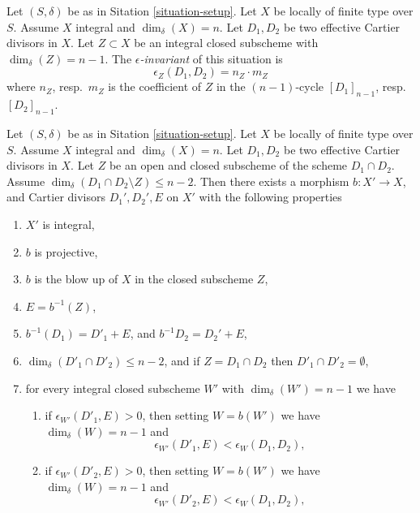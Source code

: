 \begin{definition}
\label{definition-epsilon}
Let $(S, \delta)$ be as in Sitation \ref{situation-setup}.
Let $X$ be locally of finite type over $S$.
Assume $X$ integral and $\dim_\delta(X) = n$.
Let $D_1, D_2$ be two effective Cartier divisors in $X$.
Let $Z \subset X$ be an integral closed subscheme
with $\dim_\delta(Z) = n - 1$. The {\it $\epsilon$-invariant}
of this situation is
$$
\epsilon_Z(D_1, D_2) = n_Z \cdot m_Z
$$
where $n_Z$, resp.\ $m_Z$ is the coefficient of
$Z$ in the $(n - 1)$-cycle $[D_1]_{n - 1}$, resp.\ $[D_2]_{n - 1}$.
\end{definition}

\begin{lemma}
\label{lemma-two-divisors}
Let $(S, \delta)$ be as in Sitation \ref{situation-setup}.
Let $X$ be locally of finite type over $S$.
Assume $X$ integral and $\dim_\delta(X) = n$.
Let $D_1, D_2$ be two effective Cartier divisors in $X$.
Let $Z$ be an open and closed subscheme of the scheme $D_1 \cap D_2$.
Assume $\dim_\delta(D_1 \cap D_2 \setminus Z) \leq n - 2$.
Then there exists a morphism
$b : X' \to X$, and Cartier divisors
$D_1', D_2', E$ on $X'$ with the following properties
\begin{enumerate}
\item $X'$ is integral,
\item $b$ is projective,
\item $b$ is the blow up of $X$ in the closed subscheme $Z$,
\item $E = b^{-1}(Z)$,
\item $b^{-1}(D_1) = D'_1 + E$, and $b^{-1}D_2 = D_2' + E$,
\item $\dim_\delta(D'_1 \cap D'_2) \leq n - 2$, and if
$Z = D_1 \cap D_2$ then $D'_1 \cap D'_2 = \emptyset$,
\item for every integral closed subscheme $W'$
with $\dim_\delta(W') = n - 1$ we have
\begin{enumerate}
\item if $\epsilon_{W'}(D'_1, E) > 0$, then setting
$W = b(W')$ we have
$\dim_\delta(W) = n - 1$ and
$$
\epsilon_{W'}(D'_1, E) < \epsilon_W(D_1, D_2),
$$
\item if $\epsilon_{W'}(D'_2, E) > 0$, then setting
$W = b(W')$ we have
$\dim_\delta(W) = n - 1$ and
$$
\epsilon_{W'}(D'_2, E) < \epsilon_W(D_1, D_2),
$$
\end{enumerate}
\end{enumerate}
\end{lemma}

